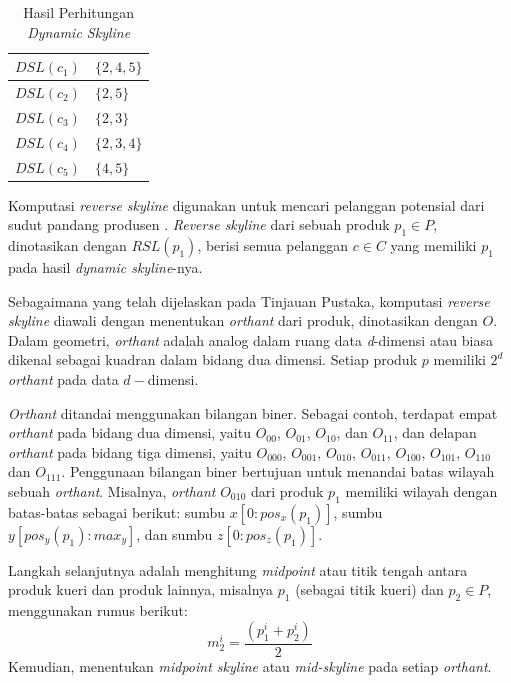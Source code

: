 \begin{table}[H]
	\small
	\centering
	\begin{tabular}{|p{2cm}|p{3cm}|}
		\hline
		$DSL(c_1)$ & $\{2, 4, 5\}$ \\ \hline
		$DSL(c_2)$ & $\{2, 5\}$ \\ \hline
		$DSL(c_3)$ & $\{2, 3\}$ \\ \hline
		$DSL(c_4)$ & $\{2, 3, 4\}$\\ \hline
		$DSL(c_5)$ & $\{4, 5\}$ \\ \hline
	\end{tabular} 
	\caption{Hasil Perhitungan \textit{Dynamic Skyline}}
	\label{tab:dsl-res}
\end{table}


Komputasi \textit{reverse skyline} digunakan untuk mencari pelanggan potensial dari sudut pandang produsen \cite{kmpp}. \textit{Reverse skyline} \cite{reverse-skyline} dari sebuah produk $p_1 \in
P$, dinotasikan dengan $RSL(p_1)$, berisi semua pelanggan $c \in C$ yang memiliki $p_1$ pada hasil \textit{dynamic skyline}-nya.

Sebagaimana yang telah dijelaskan pada Tinjauan Pustaka, komputasi \textit{reverse skyline} diawali dengan menentukan \textit{orthant} dari produk, dinotasikan dengan $O$. Dalam geometri, \textit{orthant} adalah analog dalam ruang data \textit{d}-dimensi atau biasa dikenal sebagai kuadran dalam bidang dua dimensi. Setiap produk $p$ memiliki $2^d$ \textit{orthant} pada data $d-$dimensi. 

\textit{Orthant} ditandai menggunakan bilangan biner. Sebagai contoh, terdapat empat \textit{orthant} pada bidang dua dimensi, yaitu $O_{00}$, $O_{01}$, $O_{10}$, dan $O_{11}$, dan delapan \textit{orthant} pada bidang tiga dimensi, yaitu $O_{000}$, $O_{001}$, $O_{010}$, $O_{011}$, $O_{100}$, $O_{101}$, $O_{110}$ dan $O_{111}$. Penggunaan bilangan biner bertujuan untuk menandai batas wilayah sebuah \textit{orthant}. Misalnya, \textit{orthant} $O_{010}$ dari produk $p_1$ memiliki wilayah dengan batas-batas sebagai berikut: sumbu $x [0:pos_x(p_1)]$, sumbu $y [pos_y(p_1):max_y]$, dan sumbu $z [0:pos_z(p_1)]$.

Langkah selanjutnya adalah menghitung \textit{midpoint} atau titik tengah antara produk kueri dan produk lainnya, misalnya $p_1$ (sebagai titik kueri) dan $p_2 \in P$, menggunakan rumus berikut: 
\begin{equation} \label{eq:midpoint2}
m_2^i = \frac{(p_1^i + p_2^i)}{2}
\end{equation}
Kemudian, menentukan \textit{midpoint skyline} atau \textit{mid-skyline} \cite{mid-skyline} pada setiap \textit{orthant}.

